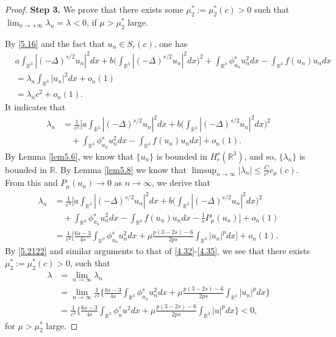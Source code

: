 \documentclass[reqno]{amsart}
\begin{document}
\begin{proof}
\noindent\textbf{Step 3.}
We prove that there exists some $\mu^*_2:=\mu^*_2(c)>0$ such that 
$\lim_{n\to +\infty}\lambda_n=\lambda<0$, if $\mu> \mu^*_2$ large.

By \eqref{5.16} and the fact that $u_n\in S_{r}(c)$, one has
\begin{align*}
&a\int_{\mathbb{R}^3}|(-\Delta)^{s/2}u_n|^2dx
 +b\Big(\int_{\mathbb{R}^3}|(-\Delta)^{s/2}u_n|^2dx\Big)^2
+\int_{\mathbb{R}^3}\phi^s_{u_n} u^2_ndx-\int_{\mathbb{R}^3}f(u_n)u_ndx\\
&= \lambda_n \int_{\mathbb{R}^3}|u_n|^2dx+o_n(1)\\
&= \lambda_n c^2+o_n(1).
\end{align*}
It indicates that
\begin{align*}
\lambda_n
&= \frac{1}{ c^2}\Big[a\int_{\mathbb{R}^3}|(-\Delta)^{s/2}u_n|^2dx
+b\Big(\int_{\mathbb{R}^3}|(-\Delta)^{s/2}u_n|^2dx\Big)^2\\
&\quad +\int_{\mathbb{R}^3}\phi^s_{u_n} u^2_ndx
 -\int_{\mathbb{R}^3}f(u_n)u_ndx\Big]+o_n(1).
\end{align*}
By Lemma \ref{lem5.6}, we  know that $\{u_n\}$ is bounded in $H^s_r(\mathbb{R}^3)$, 
and so, $\{\lambda_n\}$ is bounded in $\mathbb{R}$. 
By Lemma {\ref{lem5.8}} we know that 
$\limsup_{n\to \infty}|\lambda_n|\leq \frac{C}{c^2}c_\mu(c)$. 
From this and  $P_\mu(u_n)\to 0$ as $n\to \infty$, we derive that
\begin{align*}
\lambda_n
&= \frac{1}{ c^2}\Big[a\int_{\mathbb{R}^3}|(-\Delta)^{s/2}u_n|^2dx
 +b\Big(\int_{\mathbb{R}^3}|(-\Delta)^{s/2}u_n|^2dx\Big)^2\\
&\quad +\int_{\mathbb{R}^3}\phi^s_{u_n} u^2_ndx
 -\int_{\mathbb{R}^3}f(u_n)u_ndx-\frac{1}{s}P_\mu(u_n)\Big]+o_n(1)\\
&= \frac{1}{c^2}\Big[\frac{6s-3}{4s}\int_{\mathbb{R}^3}\phi^s_{u_n} u^2_ndx
 +\mu \frac{p(3-2s)-6}{2ps}\int_{\mathbb{R}^3}|u_n|^pdx\Big]+o_n(1).
\end{align*}
By \eqref{5.2122} and similar arguments to that of \eqref{4.32}-\eqref{4.35}, 
we see that there exists $\mu^*_2:=\mu^*_2(c)>0$, such that
\begin{equation}\label{5.212}
\begin{split}
\lambda&= \lim_{n\to \infty}\lambda_n\\
&= \lim_{n\to \infty} \frac{1}{c^2} \Big\{\frac{6s-3}{4s}
 \int_{\mathbb{R}^3}\phi^s_{u_n} u^2_ndx
 +\mu \frac{p(3-2s)-6}{2ps}\int_{\mathbb{R}^3}|u_n|^pdx\Big\}\\
&= \frac{1}{c^2} \Big\{\frac{6s-3}{4s}\int_{\mathbb{R}^3}\phi^s_{u} u^2dx
 +\mu \frac{p(3-2s)-6}{2ps}\int_{\mathbb{R}^3}|u|^pdx\Big\}
< 0,
\end{split}
\end{equation}
for $\mu>\mu^*_2$ large.


\end{proof}
\end{document}
